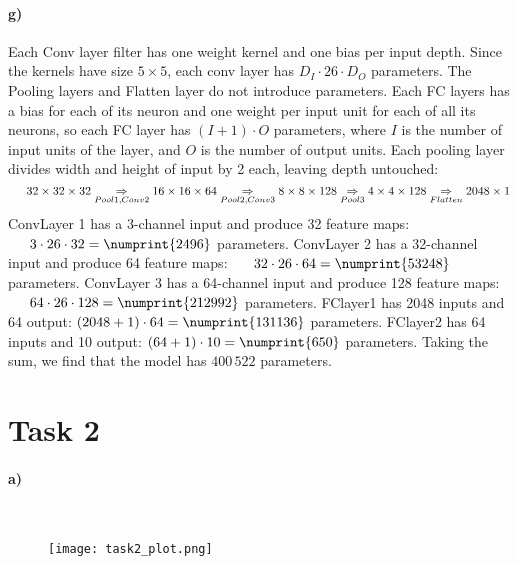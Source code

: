 \documentclass{article}
\begin{document}
\paragraph{g)}
Each Conv layer filter has one weight kernel and one bias per input depth. Since the kernels have size $5 \times 5$, each conv layer has $D_I \cdot 26 \cdot D_O$ parameters.\newline
The Pooling layers and Flatten layer do not introduce parameters.\newline
Each FC layers has a bias for each of its neuron and one weight per input unit for each of all its neurons, so each FC layer has $ (I+1) \cdot O $ parameters, where $I$ is the number of input units of the layer, and $O$ is the number of output units.\newline
Each pooling layer divides width and height of input by 2 each, leaving depth untouched:
\[
	\indent
	{32\times 32 \times 32}		\underset{Pool1, Conv2}{\Rightarrow}
	{16 \times 16 \times 64}	\underset{Pool2, Conv3}{\Rightarrow}
	{ 8 \times 8 \times 128}	\underset{Pool3}{\Rightarrow}
	{ 4 \times 4 \times 128}	\underset{Flatten}{\Rightarrow}
	2048 \times 1
\]
ConvLayer 1 has a 3-channel input and produce 32 feature maps:\newline
$ \indent 3 \cdot 26 \cdot 32 = \numprint{2496}$ parameters.\newline
ConvLayer 2 has a 32-channel input and produce 64 feature maps:\newline
$ \indent 32 \cdot 26 \cdot 64 = \numprint{53248} $ parameters.\newline
ConvLayer 3 has a 64-channel input and produce 128 feature maps:\newline
$\indent 64 \cdot 26 \cdot 128 = \numprint{212992}$ parameters.\newline
FClayer1 has 2048 inputs and 64 output:
$ (2048 + 1) \cdot 64 = \numprint{131136} $ parameters.\newline
FClayer2 has 64 inputs and 10 output:
$ (64 + 1) \cdot 10 = \numprint{650}  $ parameters.\newline
Taking the sum, we find that the model has $400\,522$ parameters.
\section*{Task 2}
\paragraph{a)}
\

\begin{figure}[h!]
	\centering
	\texttt{[image: task2\_plot.png]}\label{helloworld}
\end{figure}
\end{document}
